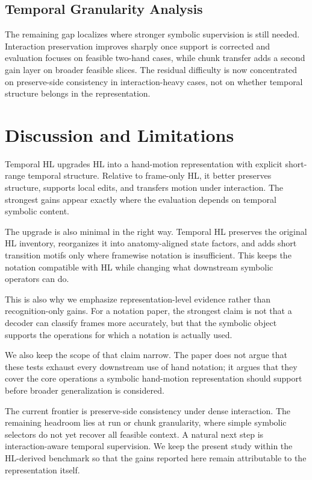\documentclass[letterpaper]{article}
\newcommand{\thl}{Temporal HL}
\begin{document}
\subsection{Temporal Granularity Analysis}

The remaining gap localizes where stronger symbolic supervision is still needed.
Interaction preservation improves sharply once support is corrected and
evaluation focuses on feasible two-hand cases, while chunk transfer adds a
second gain layer on broader feasible slices. The residual difficulty is now
concentrated on preserve-side consistency in interaction-heavy cases, not on
whether temporal structure belongs in the representation.

\section{Discussion and Limitations}

\thl{} upgrades HL into a hand-motion representation with explicit short-range
temporal structure. Relative to frame-only HL, it better preserves structure,
supports local edits, and transfers motion under interaction. The strongest
gains appear exactly where the evaluation depends on temporal symbolic content.

The upgrade is also minimal in the right way. \thl{} preserves the original HL
inventory, reorganizes it into anatomy-aligned state factors, and adds short
transition motifs only where framewise notation is insufficient. This keeps the
notation compatible with HL while changing what downstream symbolic operators
can do.

This is also why we emphasize representation-level evidence rather than
recognition-only gains. For a notation paper, the strongest claim is not that a
decoder can classify frames more accurately, but that the symbolic object
supports the operations for which a notation is actually used.

We also keep the scope of that claim narrow. The paper does not argue that
these tests exhaust every downstream use of hand notation; it argues that they
cover the core operations a symbolic hand-motion representation should support
before broader generalization is considered.

The current frontier is preserve-side consistency under dense interaction. The
remaining headroom lies at run or chunk granularity, where simple symbolic
selectors do not yet recover all feasible context. A natural next step is
interaction-aware temporal supervision. We keep the present study within the
HL-derived benchmark so that the gains reported here remain attributable to the
representation itself.
\end{document}

